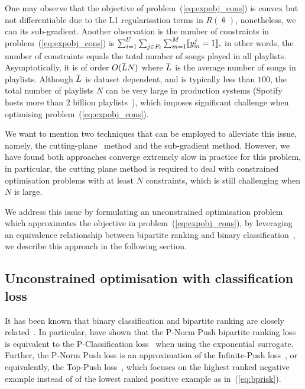 One may observe that the objective of problem~(\ref{eq:expobj_cons}) is convex but not differentiable due to 
the L1 regularisation terms in $R(\uptheta)$, nonetheless, we can its sub-gradient.
Another observation is the number of constraints in problem~(\ref{eq:expobj_cons}) is
$
\sum_{i=1}^U \sum_{j \in P_i} \sum_{m=1}^M \llbracket y_m^j = 1 \rrbracket,
$
in other words, the number of constraints equals the total number of songs played in all playlists.
Asymptotically, it is of order $O(\widebar{L} N)$ where $\widebar{L}$ is the average number of songs in playlists.
Although $\widebar{L}$ is dataset dependent, and is typically less than $100$,
the total number of playlists $N$ can be very large in production systems (\eg Spotify hosts more than $2$ billion playlists~\cite{recsysch2018}),
which imposes significant challenge when optimising problem~(\ref{eq:expobj_cons}).

We want to mention two techniques that can be employed to alleviate this issue,
namely, the cutting-plane~\cite{avriel2003nonlinear} method and the sub-gradient method.
However, we have found both approaches converge extremely slow in practice for this problem, 
in particular, the cutting plane method is required to deal with constrained optimisation problems 
with at least $N$ constraints, which is still challenging when $N$ is large.

We address this issue by formulating an unconstrained optimisation problem which approximates the objective in problem~(\ref{eq:expobj_cons}),
by leveraging an equivalence relationship between bipartite ranking and binary classification~\cite{ertekin2011equivalence},
we describe this approach in the following section.




\subsection{Unconstrained optimisation with classification loss}

It has been known that binary classification and bipartite ranking are
closely related~\cite{ertekin2011equivalence,menon2016bipartite}.
In particular, \citet{ertekin2011equivalence} have shown that the P-Norm Push bipartite ranking loss~\cite{rudin2009p}
is equivalent to the P-Classification loss~\cite{ertekin2011equivalence} when using the exponential surrogate.
Further, the P-Norm Push loss is an approximation of the Infinite-Push loss~\cite{agarwal2011infinite},
or equivalently, the Top-Push loss~\cite{li2014top}, which focuses on the highest ranked negative example instead of
of the lowest ranked positive example as in~(\ref{eq:bprisk}).

